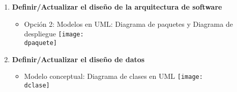 \newcommand{\dpaquete}{../img/d_paquete.png}
\newcommand{\dclase}{../img/d_clase.png}
\begin{enumerate}[label=\alph*)]
    \item \large\textbf{Definir/Actualizar el diseño de la arquitectura de software}


    \begin{itemize}
        \item Opción 2: Modelos en UML: Diagrama de paquetes y Diagrama de despliegue
        \centering
        \texttt{[image: \\dpaquete]}\par\vspace{0.3cm}
    \end{itemize}

    \item \large\textbf{Definir/Actualizar el diseño de datos}
    \begin{itemize}
        \item Modelo conceptual: Diagrama de clases en UML
        \centering
        \texttt{[image: \\dclase]}
    \end{itemize}

\end{enumerate}